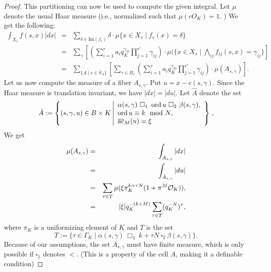 \begin{proof}
This partitioning can now be used to compute the given integral. Let $\mu$ denote the usual Haar measure (i.e., normalized such that $\mu(cO_K) =1$. ) We get the following:
\begin{eqnarray*}
 \int_{X_s} {f(s,x)}|dx|
 &=& \sum_{\delta \in \text{Im}(f_s)} \delta \cdot \mu\{x\in X_s \mid f_s(x) = \delta\}\\
 &=& \sum_\gamma  \left[\left(\sum_{i=1}^r a_i q_K^{\gamma_{i0}} \prod_{j=1}^{r'}\gamma_{ij}\right)\cdot \mu(\{x\in X_s \mid \bigwedge_{ij} f_{ij}(s,x) = \gamma_{ij}\}\right]\\ 
 &=& \sum_{\{A \mid s \in \tilde{S}_A\}} \left[ \sum_{\gamma \in B_s} \left(\sum_{i=1}^r a_i q_K^{\gamma_{i0}} \prod_{j=1}^{r'}\gamma_{ij}\right) \cdot \mu(A_{s,\gamma})\right].
\end{eqnarray*}
Let us now compute the measure of a fiber $A_{s,\gamma}$. %
Put $u =x - c(s, \gamma)$. Since the Haar measure is translation invariant, we have $|dx|=|du|$. Let $\hat{A}$ denote the set
\[\hat{A}:=\left\{(s, \gamma, u) \in B \times K \left| \begin{array}{l} 
\alpha(s,\gamma) \ \square_{1}\ \operatorname{ord} u \ \square_{2}\ \beta(s, \gamma),\\
\operatorname{ord} u \equiv k \mod N,\\ {\overline{\rm ac}}_M(u) = \xi
\end{array}
\right\}\right.,\]
We get
\begin{eqnarray*}
\mu(A_{s,\gamma}) &=& \int_{A_{s,\gamma}}|dx|\\
&=& \int_{\hat{A}_{s,\gamma}}|du|
\\
&=& \sum_{\tau \in T}\mu(\xi \pi_K^{k + \tau N} (1 + \pi^{M}{\mathcal O}_K)),\\
&=&|\xi|q_K^{-(k+M)}\sum_{\tau \in T} (q_K^{-N})^\tau,
\end{eqnarray*}
where $\pi_K$ is a uniformizing element of $K$ and $T$ is the set \[T:=\{\tau \in \Gamma_K \mid \alpha(s,\gamma ) \ \Box_{1}\ k + \tau N\ \square_{2}\ \beta(s,\gamma)\}.\]
Because of our assumptions, the set $A_{s,\gamma}$ must have finite measure, which is only possible if $\square_{1}$ denotes $<$.
(This is a property of the cell $A$, making it a definable condition)
 

\end{proof}
